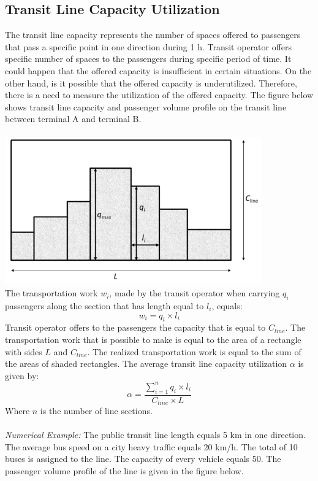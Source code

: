 \subsection{Transit Line Capacity Utilization}
The transit line capacity represents the number of spaces offered to passengers that pass a specific point in one direction during 1 h. Transit operator offers specific number of spaces to the passengers during specific period of time. It could happen that the offered capacity is insufficient in certain situations. On the other hand, is it possible that the offered capacity is underutilized. Therefore, there is a need to measure the utilization of the offered capacity. The figure below shows transit line capacity and passenger volume profile on the transit line between terminal A and terminal B.\\\\
\includegraphics{gfx/fig29.png}\\
The transportation work $ w_i $, made by the transit operator when carrying $ q_i $ passengers along the section that has length equal to $ l_i $, equals:
\begin{equation}
	w_i = q_i \times l_i
\end{equation}
Transit operator offers to the passengers the capacity that is equal to $ C_{line} $. The transportation work that is possible to make is equal to the area of a rectangle with sides $ L $ and $ C_{line} $. The realized transportation work is equal to the sum of the areas of shaded rectangles. The average transit line capacity utilization $\alpha$ is given by:
\begin{equation}
	\alpha = \frac{\sum_{i = 1}^{n} q_i \times l_i}{C_{line} \times L}
\end{equation}
Where $n$ is the number of line sections.
\\\\
\textit{Numerical Example:}
The public transit line length equals 5 km in one direction. The average bus speed on a city heavy traffic equals 20 km/h. The total of 10 buses is assigned to the line. The capacity of every vehicle equals 50. The passenger volume profile of the line is given in the figure below.\\

